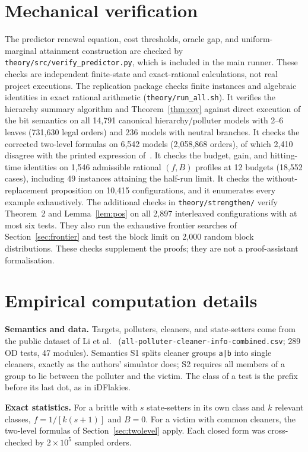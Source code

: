 \documentclass[11pt,a4paper]{article}
\theoremstyle{definition}\newtheorem{definition}[theorem]{Definition}
\theoremstyle{remark}\newtheorem{remark}[theorem]{Remark}
\theoremstyle{definition}\newtheorem{xexample}[xtheorem]{Example}\theoremstyle{plain}
\begin{document}
\section{Mechanical verification}
The predictor renewal equation, cost thresholds, oracle gap, and uniform-marginal attainment construction are checked by \texttt{theory/src/verify\_predictor.py}, which is included in the main runner. These checks are independent finite-state and exact-rational calculations, not real project executions.
The replication package checks finite instances and algebraic identities in exact rational arithmetic (\texttt{theory/run\_all.sh}). It verifies the hierarchy summary algorithm and Theorem~\ref{thm:cov} against direct execution of the bit semantics on all 14{,}791 canonical hierarchy/polluter models with 2--6 leaves (731{,}630 legal orders) and 236 models with neutral branches. It checks the corrected two-level formulas on 6{,}542 models (2{,}058{,}868 orders), of which 2{,}410 disagree with the printed expression of~\cite{wei}. It checks the budget, gain, and hitting-time identities on 1{,}546 admissible rational $(f,B)$ profiles at 12 budgets (18{,}552 cases), including 49 instances attaining the half-run limit. It checks the without-replacement proposition on 10{,}415 configurations, and it enumerates every example exhaustively. The additional checks in \texttt{theory/strengthen/} verify Theorem~2 and Lemma~\ref{lem:pos} on all 2{,}897 interleaved configurations with at most six tests. They also run the exhaustive frontier searches of Section~\ref{sec:frontier} and test the block limit on 2{,}000 random block distributions. These checks supplement the proofs; they are not a proof-assistant formalisation.

\section{Empirical computation details}
\textbf{Semantics and data.} Targets, polluters, cleaners, and state-setters come from the public dataset of Li et al.~\cite{li} (\texttt{all-polluter-cleaner-info-combined.csv}; 289 OD tests, 47 modules). Semantics S1 splits cleaner groups \texttt{a|b} into single cleaners, exactly as the authors' simulator does; S2 requires all members of a group to lie between the polluter and the victim. The class of a test is the prefix before its last dot, as in iDFlakies.

\textbf{Exact statistics.} For a brittle with $s$ state-setters in its own class and $k$ relevant classes, $f=1/[k(s+1)]$ and $B=0$. For a victim with common cleaners, the two-level formulas of Section~\ref{sec:twolevel} apply. Each closed form was cross-checked by $2\times10^5$ sampled orders.
\end{document}
